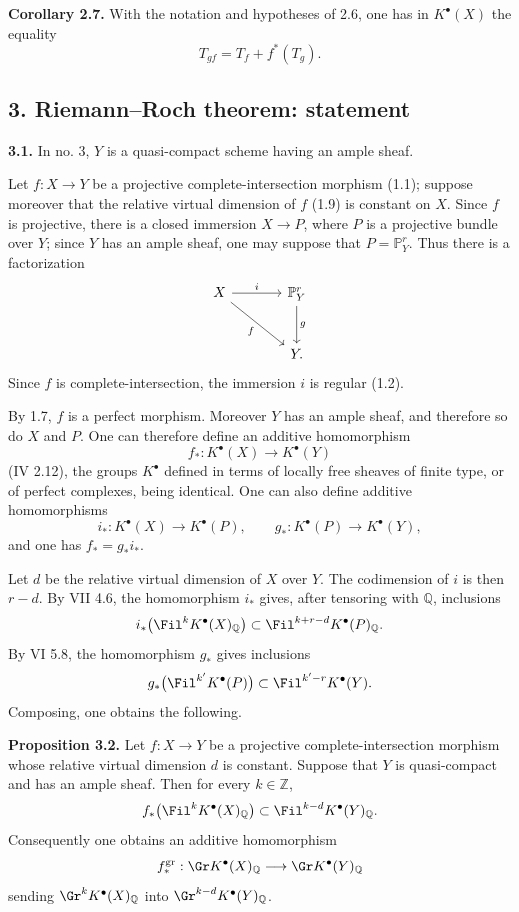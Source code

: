 \textbf{Corollary 2.7.} With the notation and hypotheses of 2.6, one has in $K^{\bullet}(X)$ the equality
\[
T_{gf}=T_f+f^*(T_g).
\]

\subsection*{3. Riemann--Roch theorem: statement}

\textbf{3.1.} In no. 3, $Y$ is a quasi-compact scheme having an ample sheaf.

Let $f:X\to Y$ be a projective complete-intersection morphism (1.1); suppose moreover that the relative virtual dimension of $f$ (1.9) is constant on $X$. Since $f$ is projective, there is a closed immersion $X\to P$, where $P$ is a projective bundle over $Y$; since $Y$ has an ample sheaf, one may suppose that $P=\mathbb P^r_Y$. Thus there is a factorization
\[
\begin{tikzcd}[column sep=large,row sep=large]
X \arrow[r,"i"] \arrow[dr,"f"'] & \mathbb P^r_Y \arrow[d,"g"]\\
& Y.
\end{tikzcd}
\]
Since $f$ is complete-intersection, the immersion $i$ is regular (1.2).

By 1.7, $f$ is a perfect morphism. Moreover $Y$ has an ample sheaf, and therefore so do $X$ and $P$. One can therefore define an additive homomorphism
\[
f_*:K^{\bullet}(X)\longrightarrow K^{\bullet}(Y)
\]
(IV 2.12), the groups $K^{\bullet}$ defined in terms of locally free sheaves of finite type, or of perfect complexes, being identical. One can also define additive homomorphisms
\[
i_*:K^{\bullet}(X)\longrightarrow K^{\bullet}(P),
\qquad
 g_*:K^{\bullet}(P)\longrightarrow K^{\bullet}(Y),
\]
and one has $f_*=g_*i_*$.

Let $d$ be the relative virtual dimension of $X$ over $Y$. The codimension of $i$ is then $r-d$. By VII 4.6, the homomorphism $i_*$ gives, after tensoring with $\mathbb Q$, inclusions
\[
i_*\bigl(\Fil^kK^{\bullet}(X)_{\mathbb Q}\bigr)
\subset
\Fil^{k+r-d}K^{\bullet}(P)_{\mathbb Q}.
\]
By VI 5.8, the homomorphism $g_*$ gives inclusions
\[
g_*\bigl(\Fil^{k'}K^{\bullet}(P)\bigr)
\subset
\Fil^{k'-r}K^{\bullet}(Y).
\]
Composing, one obtains the following.

\textbf{Proposition 3.2.} Let $f:X\to Y$ be a projective complete-intersection morphism whose relative virtual dimension $d$ is constant. Suppose that $Y$ is quasi-compact and has an ample sheaf. Then for every $k\in\mathbb Z$,
\[
f_*\bigl(\Fil^kK^{\bullet}(X)_{\mathbb Q}\bigr)
\subset
\Fil^{k-d}K^{\bullet}(Y)_{\mathbb Q}.
\]
Consequently one obtains an additive homomorphism
\[
f^{\mathrm{gr}}_*:\Gr K^{\bullet}(X)_{\mathbb Q}\longrightarrow
\Gr K^{\bullet}(Y)_{\mathbb Q}
\]
sending $\Gr^kK^{\bullet}(X)_{\mathbb Q}$ into $\Gr^{k-d}K^{\bullet}(Y)_{\mathbb Q}$.

